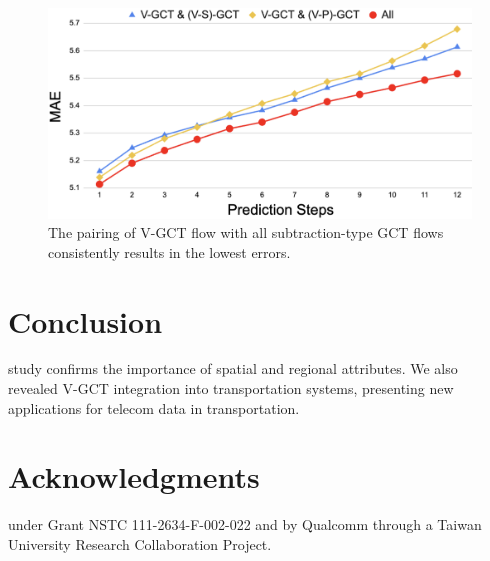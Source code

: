 \documentclass[letterpaper]{article} %
\begin{document}
\begin{figure}[h]
\centering
\includegraphics[width=1\linewidth]{Figure/parameter_sensitivity.png}
\caption{The pairing of V-GCT flow with all subtraction-type GCT flows consistently results in the lowest errors.}
\label{fig:sensitivity}
\end{figure}

\section{Conclusion}
 study confirms the importance of spatial and regional attributes. We also revealed V-GCT integration into transportation systems, presenting new applications for telecom data in transportation.

\clearpage

\section{Acknowledgments}
 under Grant NSTC 111-2634-F-002-022 and by Qualcomm through a Taiwan University Research Collaboration Project.

\clearpage

\end{document}

